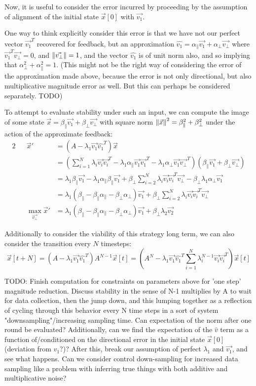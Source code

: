\documentclass[letterpaper]{article}
\theoremstyle{remark}
\newcommand{\eqn}[1]{\begin{alignat*}{2}#1\end{alignat*}}
\begin{document}
Now, it is useful to consider the error incurred by proceeding by the assumption of alignment of the initial state $\vec{x}[0]$ with $\vec{v_1}$.

One way to think explicitly consider this error is that we have not our perfect vector $\vec{v_1}^T$ recovered for feedback, but an approximation $\hat{v_1} = \alpha_\parallel\vec{v_1} + \alpha_\perp\vec{v_\perp}$ where $\vec{v_1}^T\vec{v_\perp} = 0$, and $\norm{\vec{v_\perp}} = 1$, and the vector $\hat{v_1}$ is of unit norm also, and so implying that $\alpha_\perp^2 + \alpha_\parallel^2 = 1$. (This might not be the right way of considering the error of the approximation made above, because the error is not only directional, but also multiplicative magnitude error as well. But this can perhaps be considered separately. TODO)

To attempt to evaluate stability under such an input, we can compute the image of some state $\vec{x} = \beta_\parallel \vec{v_1} + \beta_\perp\vec{v_\perp}$ with square norm $\norm{\vec{x}}^2 = \beta_\parallel^2 + \beta_\perp^2$ under the action of the approximate feedback:
\eqn{
&&\vec{x}' &= \left(A - \lambda_1\vec{v_1}\hat{v_1}^T\right)\vec{x}\\
&& &=\left(\sum_{i=1}^N\lambda_i\vec{v_i}\vec{v_i}^T - \lambda_1\alpha_\parallel\vec{v_1}\vec{v_1}^T - \lambda_1\alpha_\perp\vec{v_1}\vec{v_\perp}^T\right)(\beta_\parallel\vec{v_1}+\beta_\perp\vec{v_\perp})\\
&& &=\lambda_1\beta_\parallel\vec{v_1} - \lambda_1\alpha_\parallel\beta_\parallel\vec{v_1} + \beta_\perp\sum_{i=2}^N\lambda_i\vec{v_i}\vec{v_i}^T\vec{v_\perp} - \beta_\perp\lambda_1\alpha_\perp \vec{v_1}\\
&& &= \lambda_1(\beta_\parallel - \beta_\parallel\alpha_\parallel - \beta_\perp\alpha_\perp)\vec{v_1} + \beta_\perp\sum_{i=2}^N\lambda_i\vec{v_i}\vec{v_i}^T\vec{v_\perp}\\
&&\max_{\vec{v_\perp}} \vec{x}' &= \lambda_1(\beta_\parallel - \beta_\parallel\alpha_\parallel - \beta_\perp\alpha_\perp)\vec{v_1} + \beta_\perp\lambda_2\vec{v_2}
}

Additionally to consider the viability of this strategy long term, we can also consider the transition every $N$ timesteps:
$$\vec{x}[t + N] = \left(A -\lambda_1\vec{v_1}\hat{v_1}^T\right)A^{N-1}\vec{x}[t] = \left(A^N-\lambda_1\vec{v_1}\hat{v_1}^T\sum_{i=1}^N\lambda_i^{N-1}\vec{v_i}\vec{v_i}^T\right)\vec{x}[t]$$

TODO: Finish computation for constraints on parameters above for 'one step' magnitude reduction. Discuss stability in the sense of N-1 multiplies by A to wait for data collection, then the jump down, and this lumping together as a reflection of cycling through this behavior every N time steps in a sort of system "downsampling"/increasing sampling time. Can expectation of the norm after one round be evaluated? Additionally, can we find the expectation of the $\hat{v}$ term as a function of/conditioned on the directional error in the initial state $\vec{x}[0]$ (deviation from $v_1$?)? After this, break our assumption of perfect $\lambda_1$ and $\vec{v_1}$, and see what happens. Can we consider control down-sampling for increased data sampling like a problem with inferring true things with both additive and multiplicative noise?
\end{document}

